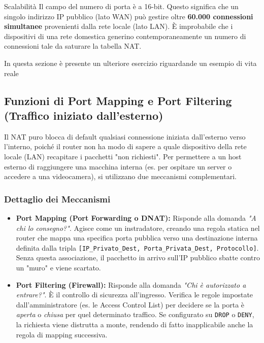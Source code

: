 \documentclass[a4paper,12pt]{report}
\begin{document}
\begin{notebox}{Scalabilità}
    Il campo del numero di porta è a 16-bit. Questo significa che un singolo indirizzo IP pubblico (lato WAN) può gestire oltre \textbf{60.000 connessioni simultanee} provenienti dalla rete locale (lato LAN).
    È improbabile che i dispositivi di una rete domestica generino contemporaneamente un numero di connessioni tale da saturare la tabella NAT.
\end{notebox}

\begin{collegamentobox}[title=�� ESEMPIO:  (Cap. 5) sezione 5.3.6 Aggregazione gerarchica tramite NAT]
    In questa sezione è presente un ulteriore esercizio riguardande un esempio di vita reale
\end{collegamentobox}

\newpage
\subsection{Funzioni di Port Mapping e Port Filtering (Traffico iniziato dall'esterno)}

Il NAT puro blocca di default qualsiasi connessione iniziata dall'esterno verso l'interno, poiché il router non ha modo di sapere a quale dispositivo della rete locale (LAN) recapitare i pacchetti "non richiesti". Per permettere a un host esterno di raggiungere una macchina interna (es. per ospitare un server o accedere a una videocamera), si utilizzano due meccanismi complementari.

\subsubsection*{Dettaglio dei Meccanismi}

\begin{itemize}
    \item \textbf{Port Mapping (Port Forwarding o DNAT):} Risponde alla domanda \textit{"A chi lo consegno?"}. Agisce come un instradatore, creando una regola statica nel router che mappa una specifica porta pubblica verso una destinazione interna definita dalla tripla \texttt{[IP\_Privato\_Dest, Porta\_Privata\_Dest, Protocollo]}. Senza questa associazione, il pacchetto in arrivo sull'IP pubblico sbatte contro un "muro" e viene scartato.
    
    \item \textbf{Port Filtering (Firewall):} Risponde alla domanda \textit{"Chi è autorizzato a entrare?"}. È il controllo di sicurezza all'ingresso. Verifica le regole impostate dall'amministratore (es. le Access Control List) per decidere se la porta è \textit{aperta} o \textit{chiusa} per quel determinato traffico. Se configurato su \texttt{DROP} o \texttt{DENY}, la richiesta viene distrutta a monte, rendendo di fatto inapplicabile anche la regola di mapping successiva.
\end{itemize}
\end{document}
